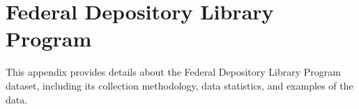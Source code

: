 \section{Federal Depository Library Program}
\label{appendix:fdlp}

This appendix provides details about the Federal Depository Library Program dataset, including its collection methodology, data statistics, and examples of the data.

